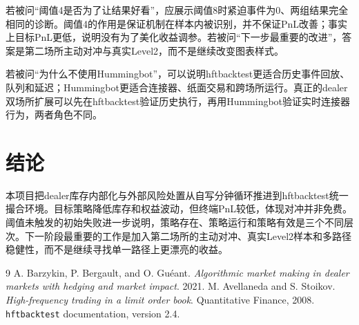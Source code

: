 \documentclass[11pt]{ctexart}
\begin{document}
若被问“阈值4是否为了让结果好看”，应展示阈值8时紧迫事件为0、两组结果完全相同的诊断。阈值4的作用是保证机制在样本内被识别，并不保证PnL改善；事实上目标PnL更低，说明没有为了美化收益调参。若被问“下一步最重要的改进”，答案是第二场所主动对冲与真实Level2，而不是继续改变图表样式。

若被问“为什么不使用Hummingbot”，可以说明hftbacktest更适合历史事件回放、队列和延迟；Hummingbot更适合连接器、纸面交易和跨场所运行。真正的dealer双场所扩展可以先在hftbacktest验证历史执行，再用Hummingbot验证实时连接器行为，两者角色不同。

\section{结论}
本项目把dealer库存内部化与外部风险处置从自写分钟循环推进到hftbacktest统一撮合环境。目标策略降低库存和权益波动，但终端PnL较低，体现对冲并非免费。阈值未触发的初始失败进一步说明，策略存在、策略运行和策略有效是三个不同层次。下一阶段最重要的工作是加入第二场所的主动对冲、真实Level2样本和多路径稳健性，而不是继续寻找单一路径上更漂亮的收益。

\begin{thebibliography}{9}
 A. Barzykin, P. Bergault, and O. Guéant. \emph{Algorithmic market making in dealer markets with hedging and market impact}. 2021.
 M. Avellaneda and S. Stoikov. \emph{High-frequency trading in a limit order book}. Quantitative Finance, 2008.
 \texttt{hftbacktest} documentation, version 2.4.
\end{thebibliography}
\end{document}
